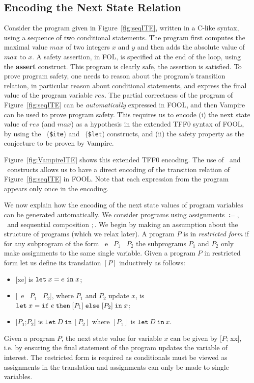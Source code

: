 \subsection{Encoding the Next State Relation}\label{sec:foolp}

Consider the program given in
Figure~\ref{fig:seqITE}, written in a C-like syntax, using a sequence
of two conditional statements.
The program first computes the maximal value $\mathit{max}$ of two integers $x$ and
$y$ and then adds the absolute value of $\mathit{max}$ to $x$. A safety assertion,
in FOL, is specified at the end of the loop, using the
{\bf assert} construct. This program is clearly safe, the
assertion is satisfied. To prove program safety, one needs to reason
about the program's transition relation, in particular reason about
conditional statements, and express the final value of
the program variable $\mathit{res}$. The partial correctness of the program
of Figure~\ref{fig:seqITE} can be \emph{automatically} expressed in FOOL,
and then Vampire can be used to prove program safety.
This requires us to encode (i)
the next state value of $\mathit{res}$ (and $\mathit{max}$) as a hypothesis
in the extended TFF0 syntax of FOOL,
by using the \ITE\ ({\tt \$ite}) and \LETIN\ ({\tt \$let})
constructs, and (ii)
the safety property as the conjecture to be proven by Vampire.

Figure~\ref{fig:VampireITE} shows this extended TFF0 encoding.
The use of \ITE\ and \LETIN\ constructs allows us to have a
direct  encoding of the  transition relation of
Figure~\ref{fig:seqITE} in FOOL. Note that each expression from the program appears only once in the encoding.

We now explain how the encoding of the next state values of program
variables can be generated automatically.
We consider programs using assignments $\coloneqq$,
\ITE\ and sequential composition $;$.
We begin by making an assumption about the structure of programs (which we relax later). A program $P$ is in \emph{restricted form} if for any subprogram of the form \IF\ e \THEN\ $P_1$ \ELSE\ $P_2$ the subprograms $P_1$ and $P_2$ only make assignments to the same single variable. Given a program $P$ in restricted form let us define its translation $[P]$ inductively as follows:
%
\begin{itemize}
	\item $[$x\ASS e$]$ is $\mathtt{let}\;{x}={e}\;\allowbreak\mathtt{in}\;{x}$;
	\item $[$\IF\ e \THEN\ $P_1$ \ELSE\ $P_2]$, where $P_1$ and
          $P_2$ update $x$,  is $\mathtt{let}\;{x}={\mathtt{if}\;{e}\;\allowbreak\mathtt{then}\;{[P_1]}\;\allowbreak\mathtt{else}\;{[P_2]}}\;\allowbreak\mathtt{in}\;{x}$;
	\item $[P_1$;\;$P_2]$ is $\mathtt{let}~D~\mathtt{in}~[P_2]$ where $[P_1]$ is $\mathtt{let}~D~\mathtt{in}~x$.
\end{itemize}
%
Given a program $P$, the next state value for variable $x$ can be
given by $[P$; x\ASS x$]$,
i.e. by ensuring the final statement of the program updates the
variable of interest.
The restricted form is required as conditionals must be viewed
as assignments in the translation and assignments can only be made to single variables.

